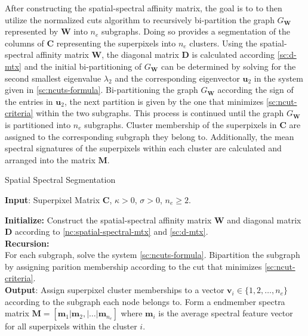 After constructing the spatial-spectral affinity matrix, the goal is to to then utilize the normalized cuts algorithm to recursively bi-partition the graph $G_\mathbf{W}$ represented by $\mathbf{W}$ into $n_e$ subgraphs. Doing so provides a segmentation of the columns of $\mathbf{C}$ representing the superpixels into $n_e$ clusters. Using the spatial-spectral affinity matrix $\mathbf{W}$, the diagonal matrix $\mathbf{D}$ is calculated according \eqref{sc:d-mtx} and the initial bi-partitioning of $G_\mathbf{W}$ can be determined by solving for the second smallest eigenvalue $\lambda_2$ and the corresponding eigenvector $\mathbf{u}_2$ in the system given in \eqref{sc:ncuts-formula}. Bi-partitioning the graph $G_\mathbf{W}$ according the sign of the entries in $\mathbf{u}_2$, the next partition is given by the one that minimizes \eqref{sc:ncut-criteria} within the two subgraphs. This process is continued until the graph $G_\mathbf{W}$ is partitioned into $n_e$ subgraphs. Cluster membership of the superpixels in $\mathbf{C}$ are assigned to the corresponding subgraph they belong to. Additionally, the mean spectral signatures of the superpixels within each cluster are calculated and arranged into the matrix $\mathbf{M}$.

\begin{algorithm}[H]
    \label{Spatial Spectral Segmentation}
    \caption{Spatial Spectral Segmentation}
    \textbf{Input}: Superpixel Matrix $\mathbf{C}$, $\kappa > 0$, $\sigma > 0$, $n_e \geq 2$.

    \textbf{Initialize:} Construct the spatial-spectral affinity matrix $\mathbf{W}$ and diagonal matrix $\mathbf{D}$ according to \eqref{nc:spatial-spectral-mtx} and \eqref{sc:d-mtx}.\\

    \textbf{Recursion:}\\
        \quad For each subgraph, solve the system \eqref{sc:ncuts-formula}. Bipartition the subgraph by assigning parition membership according to the cut that minimizes \eqref{sc:ncut-criteria}. 
    \\

    \textbf{Output}: Assign superpixel cluster memberships to a vector $\mathbf{v}_i \in \{1, 2, \dots ,n_e\}$ according to the subgraph each node belongs to. Form a endmember spectra matrix $\mathbf{M} = [ \mathbf{m}_1 | \mathbf{m}_2, | \dots | \mathbf{m}_{n_e} ]$ where $\mathbf{m}_i$ is the average spectral feature vector for all superpixels within the cluster $i$.
\end{algorithm}

